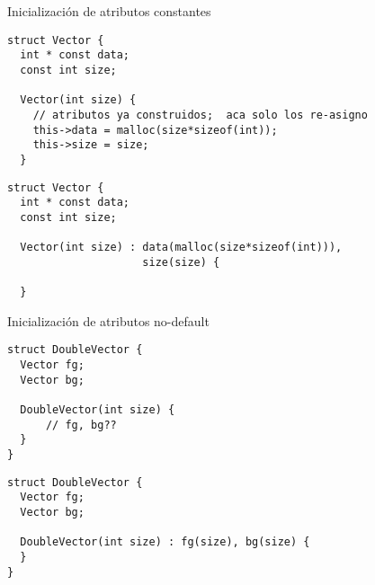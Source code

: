 \begin{frame}[fragile]{Inicializaci\'on de atributos constantes}
        \begin{lstlisting}[style=normal,firstnumber=1,linebackgroundcolor={%
                 \btLstHLR<1>{2,7}%
                 \btLstHLR<2>{3,8}%
         }]
struct Vector {
  int * const data;
  const int size;

  Vector(int size) {
    // atributos ya construidos;  aca solo los re-asigno
    this->data = malloc(size*sizeof(int));
    this->size = size;
  }
        \end{lstlisting}
        \pause
        \pause
        \begin{lstlisting}[style=normal,firstnumber=1,linebackgroundcolor={%
                 \btLstHLB<3>{2,5}%
                 \btLstHLB<4>{3,6}%
         }]
struct Vector {
  int * const data;
  const int size;

  Vector(int size) : data(malloc(size*sizeof(int))),
                     size(size) {

  }
        \end{lstlisting}
\end{frame}

\begin{frame}[fragile]{Inicializaci\'on de atributos no-default}
    \begin{lstlisting}[style=normal,firstnumber=1,linebackgroundcolor={%
                 \btLstHLR<1>{5}%
         }]
struct DoubleVector {
  Vector fg;
  Vector bg;

  DoubleVector(int size) {
      // fg, bg??
  }
}
        \end{lstlisting}
        \pause
    \begin{lstlisting}[style=normal,firstnumber=1,linebackgroundcolor={%
                 \btLstHLB<2>{5}%
         }]
struct DoubleVector {
  Vector fg;
  Vector bg;

  DoubleVector(int size) : fg(size), bg(size) {
  }
}
        \end{lstlisting}
\end{frame}

